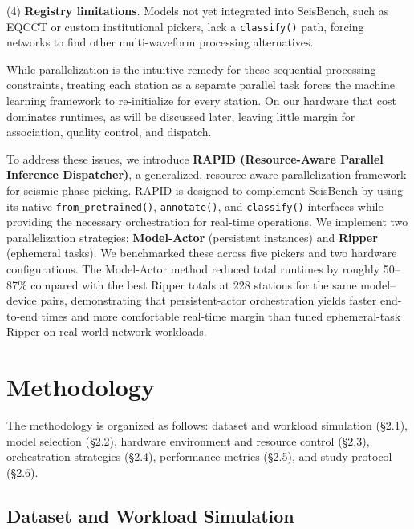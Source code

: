 (4) \textbf{Registry limitations}. Models not yet integrated into SeisBench, such as EQCCT or custom institutional pickers, lack a \texttt{classify()} path, forcing networks to find other multi-waveform processing alternatives.

While parallelization is the intuitive remedy for these sequential processing constraints, treating each station as a separate parallel task forces the machine learning framework to re-initialize for every station. On our hardware that cost dominates runtimes, as will be discussed later, leaving little margin for association, quality control, and dispatch.

To address these issues, we introduce \textbf{RAPID (Resource-Aware Parallel Inference Dispatcher)}, a generalized, resource-aware parallelization framework for seismic phase picking. RAPID is designed to complement SeisBench by using its native \texttt{from\_pretrained()}, \texttt{annotate()}, and \texttt{classify()} interfaces while providing the necessary orchestration for real-time operations. We implement two parallelization strategies: \textbf{Model-Actor} (persistent instances) and \textbf{Ripper} (ephemeral tasks). We benchmarked these across five pickers and two hardware configurations. The Model-Actor method reduced total runtimes by roughly 50–87\% compared with the best Ripper totals at 228 stations for the same model–device pairs, demonstrating that persistent-actor orchestration yields faster end-to-end times and more comfortable real-time margin than tuned ephemeral-task Ripper on real-world network workloads.

\section{Methodology}

The methodology is organized as follows: dataset and workload simulation (\S2.1), model selection (\S2.2), hardware environment and resource control (\S2.3), orchestration strategies (\S2.4), performance metrics (\S2.5), and study protocol (\S2.6).

\subsection{Dataset and Workload Simulation}

